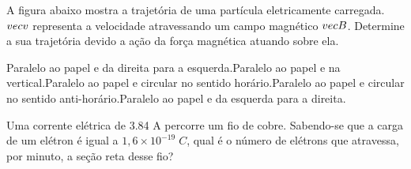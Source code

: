 \documentclass[12pt, addpoints]{exam}
\begin{document}
        \begin{questions}
\begin{multicols*}{2}
\question[20] A ﬁgura abaixo mostra a trajetória de uma partícula eletricamente carregada. $\\vec{{v}}$ representa a velocidade atravessando um campo magnético $\\vec{{B}}$. Determine a sua trajetória devido a ação da força magnética atuando sobre ela.
        
        \begin{center}
            \begin{minipage}[c]{0.5\linewidth}
            \end{minipage}
        \end{center}

        

\begin{choices}
\choice Paralelo ao papel e da direita para a esquerda.\choice Paralelo ao papel e na vertical.\choice Paralelo ao papel e circular no sentido horário.\choice Paralelo ao papel e circular no sentido anti-horário.\choice Paralelo ao papel e da esquerda para a direita.\end{choices}
\question[20] Uma corrente elétrica de    3.84 A percorre um ﬁo de cobre. Sabendo-se que a carga de um elétron é igual a $1,6\times 10^{-19}\;C$, qual é o número de elétrons que atravessa, por minuto, a seção reta desse ﬁo?


\end{multicols*}
\end{questions}
\end{document}
